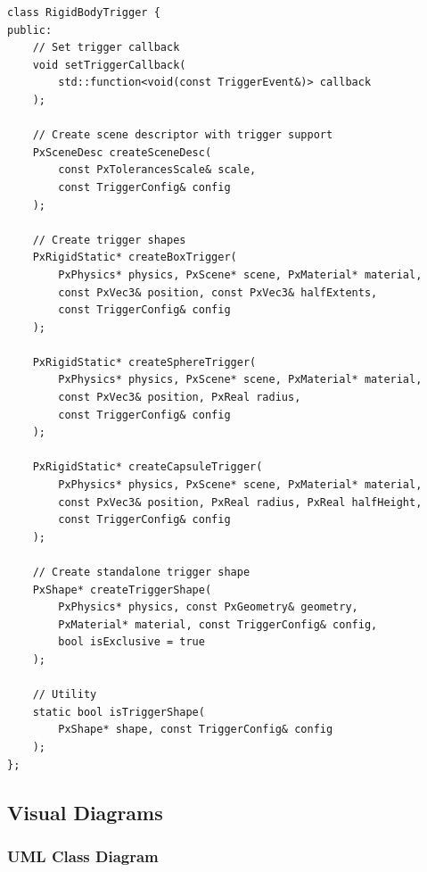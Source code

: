 \begin{lstlisting}[caption={RigidBodyTrigger core methods}]
class RigidBodyTrigger {
public:
    // Set trigger callback
    void setTriggerCallback(
        std::function<void(const TriggerEvent&)> callback
    );

    // Create scene descriptor with trigger support
    PxSceneDesc createSceneDesc(
        const PxTolerancesScale& scale,
        const TriggerConfig& config
    );

    // Create trigger shapes
    PxRigidStatic* createBoxTrigger(
        PxPhysics* physics, PxScene* scene, PxMaterial* material,
        const PxVec3& position, const PxVec3& halfExtents,
        const TriggerConfig& config
    );

    PxRigidStatic* createSphereTrigger(
        PxPhysics* physics, PxScene* scene, PxMaterial* material,
        const PxVec3& position, PxReal radius,
        const TriggerConfig& config
    );

    PxRigidStatic* createCapsuleTrigger(
        PxPhysics* physics, PxScene* scene, PxMaterial* material,
        const PxVec3& position, PxReal radius, PxReal halfHeight,
        const TriggerConfig& config
    );

    // Create standalone trigger shape
    PxShape* createTriggerShape(
        PxPhysics* physics, const PxGeometry& geometry,
        PxMaterial* material, const TriggerConfig& config,
        bool isExclusive = true
    );

    // Utility
    static bool isTriggerShape(
        PxShape* shape, const TriggerConfig& config
    );
};
\end{lstlisting}


\subsection{Visual Diagrams}

\subsubsection{UML Class Diagram}

